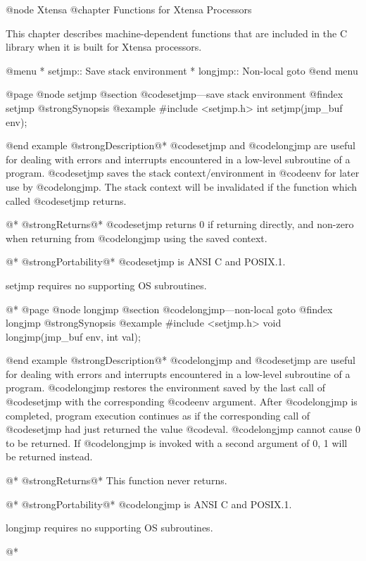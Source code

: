 @node Xtensa
@chapter Functions for Xtensa Processors

This chapter describes machine-dependent functions that are included
in the C library when it is built for Xtensa processors.

@menu
* setjmp::      Save stack environment
* longjmp::     Non-local goto
@end menu

@page
@node setjmp
@section @code{setjmp}---save stack environment
@findex setjmp
@strong{Synopsis}
@example
#include <setjmp.h>
int setjmp(jmp_buf env);

@end example
@strong{Description}@*
@code{setjmp} and @code{longjmp} are useful for dealing with errors
and interrupts encountered in a low-level subroutine of a program.
@code{setjmp} saves the stack context/environment in @code{env} for
later use by @code{longjmp}.  The stack context will be invalidated if
the function which called @code{setjmp} returns.

@*
@strong{Returns}@*
@code{setjmp} returns 0 if returning directly, and non-zero when
returning from @code{longjmp} using the saved context.

@*
@strong{Portability}@*
@code{setjmp} is ANSI C and POSIX.1.

setjmp requires no supporting OS subroutines.

@*
@page
@node longjmp
@section @code{longjmp}---non-local goto
@findex longjmp
@strong{Synopsis}
@example
#include <setjmp.h>
void longjmp(jmp_buf env, int val);

@end example
@strong{Description}@*
@code{longjmp} and @code{setjmp} are useful for dealing with errors
and interrupts encountered in a low-level subroutine of a program.
@code{longjmp} restores the environment saved by the last call of
@code{setjmp} with the corresponding @code{env} argument.  After
@code{longjmp} is completed, program execution continues as if the
corresponding call of @code{setjmp} had just returned the value
@code{val}.  @code{longjmp} cannot cause 0 to be returned.  If
@code{longjmp} is invoked with a second argument of 0, 1 will be
returned instead.

@*
@strong{Returns}@*
This function never returns.

@*
@strong{Portability}@*
@code{longjmp} is ANSI C and POSIX.1.

longjmp requires no supporting OS subroutines.

@*
